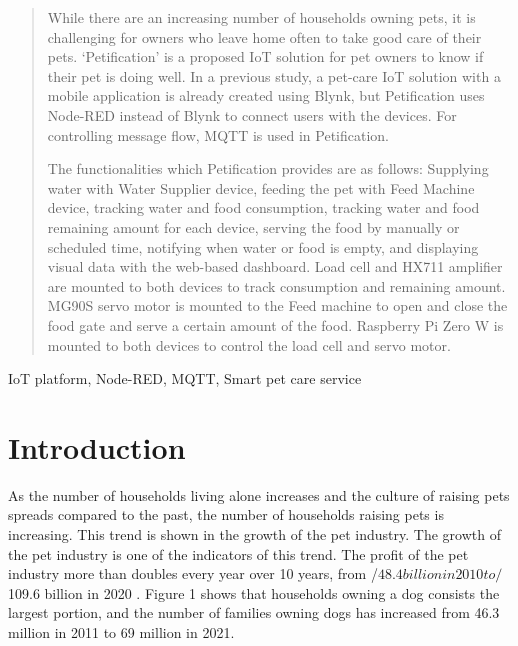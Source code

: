 \documentclass[conference]{IEEEtran}
\begin{document}
\begin{abstract}
While there are an increasing number of households owning pets, it is challenging for owners who leave home often to take good care of their pets.
‘Petification’ is a proposed IoT solution for pet owners to know if their pet is doing well.
In a previous study, a pet-care IoT solution with a mobile application is already created using Blynk, but Petification uses Node-RED instead of Blynk to connect users with the devices. For controlling message flow, MQTT is used in Petification.


The functionalities which Petification provides are as follows: Supplying water with Water Supplier device, feeding the pet with Feed Machine device, tracking water and food consumption, tracking water and food remaining amount for each device, serving the food by manually or scheduled time, notifying when water or food is empty, and displaying visual data with the web-based dashboard.
Load cell and HX711 amplifier are mounted to both devices to track consumption and remaining amount. MG90S servo motor is mounted to the Feed machine to open and close the food gate and serve a certain amount of the food. Raspberry Pi Zero W is mounted to both devices to control the load cell and servo motor.


\end{abstract}
\begin{IEEEkeywords}
IoT platform, Node-RED, MQTT, Smart pet care service 
\end{IEEEkeywords}
\section{Introduction}
As the number of households living alone increases and the culture of raising pets spreads compared to the past, the number of households raising pets is increasing. This trend is shown in the growth of the pet industry. The growth of the pet industry is one of the indicators of this trend. The profit of the pet industry more than doubles every year over 10 years, from /$48.4 billion in 2010 to /$109.6 billion in 2020 \cite{b1}. Figure 1 shows that households owning a dog consists the largest portion, and the number of families owning dogs has increased from 46.3 million in 2011 to 69 million in 2021.
\end{document}
